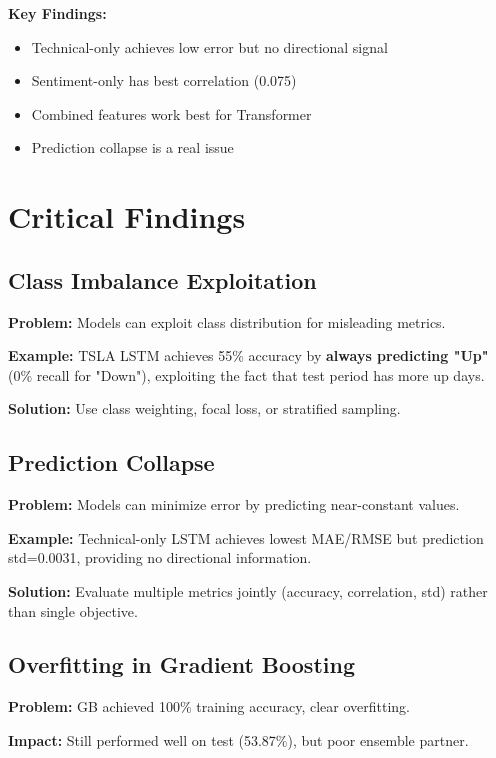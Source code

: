 \documentclass[10pt,twocolumn]{article}
\begin{document}
\textbf{Key Findings:}
\begin{itemize}
\item Technical-only achieves low error but no directional signal
\item Sentiment-only has best correlation (0.075)
\item Combined features work best for Transformer
\item Prediction collapse is a real issue
\end{itemize}

\section{Critical Findings}

\subsection{Class Imbalance Exploitation}

\textbf{Problem:} Models can exploit class distribution for misleading metrics.

\textbf{Example:} TSLA LSTM achieves 55\% accuracy by \textbf{always predicting "Up"} (0\% recall for "Down"), exploiting the fact that test period has more up days.

\textbf{Solution:} Use class weighting, focal loss, or stratified sampling.

\subsection{Prediction Collapse}

\textbf{Problem:} Models can minimize error by predicting near-constant values.

\textbf{Example:} Technical-only LSTM achieves lowest MAE/RMSE but prediction std=0.0031, providing no directional information.

\textbf{Solution:} Evaluate multiple metrics jointly (accuracy, correlation, std) rather than single objective.

\subsection{Overfitting in Gradient Boosting}

\textbf{Problem:} GB achieved 100\% training accuracy, clear overfitting.

\textbf{Impact:} Still performed well on test (53.87\%), but poor ensemble partner.
\end{document}
